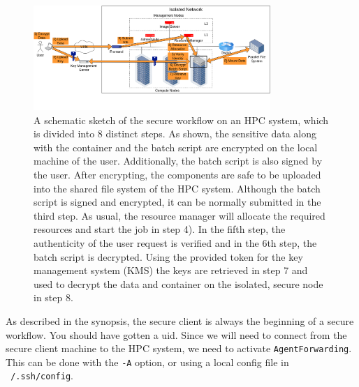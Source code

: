 \documentclass[paper=a4]{scrartcl}
\begin{document}
\begin{figure}[!ht]
    \centerline{\includegraphics[width=0.8\textwidth]{secure_submission_neu.png}}
    \caption{A schematic sketch of the secure workflow on an HPC system, which is divided into 8 distinct steps. As shown, the sensitive data along with the container and the batch script are encrypted on the local machine of the user. Additionally, the batch script is also signed by the user. After encrypting, the components are safe to be uploaded into the shared file system of the HPC system. Although the batch script is signed and encrypted, it can be normally submitted in the third step. As usual, the resource manager will allocate the required resources and start the job in step 4). In the fifth step, the authenticity of the user request is verified and in the 6th step, the batch script is decrypted. Using the provided token for the key management system (KMS) the keys are retrieved in step 7 and used to decrypt the data and container on the isolated, secure node in step 8. }
    \label{fig:secure_sbatch}
\end{figure}

As described in the synopsis, the secure client is always the beginning of a secure workflow. 
You should have gotten a uid. 
Since we will need to connect from the secure client machine to the HPC system, we need to activate \texttt{AgentForwarding}. This can be done with the \texttt{-A} option, or using a local config file in \texttt{~/.ssh/config}. \\
\end{document}
